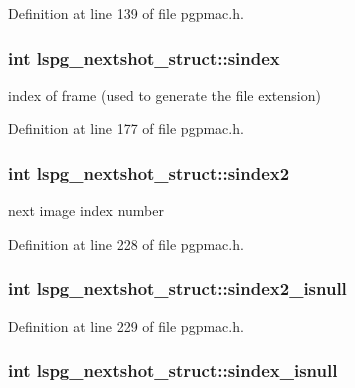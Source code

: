 Definition at line 139 of file pgpmac.h.\hypertarget{structlspg__nextshot__struct_a5d096f2c2bf9be29c44129b54eaf01da}{
\subsubsection[{sindex}]{\setlength{\rightskip}{0pt plus 5cm}int {\bf lspg\_\-nextshot\_\-struct::sindex}}}
\label{structlspg__nextshot__struct_a5d096f2c2bf9be29c44129b54eaf01da}


index of frame (used to generate the file extension) 

Definition at line 177 of file pgpmac.h.\hypertarget{structlspg__nextshot__struct_ae9d0cfdff6868e0ba9cd5acafbe133db}{
\subsubsection[{sindex2}]{\setlength{\rightskip}{0pt plus 5cm}int {\bf lspg\_\-nextshot\_\-struct::sindex2}}}
\label{structlspg__nextshot__struct_ae9d0cfdff6868e0ba9cd5acafbe133db}


next image index number 

Definition at line 228 of file pgpmac.h.\hypertarget{structlspg__nextshot__struct_a28e0b5c32a2741ef22edeb9d35b04e4d}{
\subsubsection[{sindex2\_\-isnull}]{\setlength{\rightskip}{0pt plus 5cm}int {\bf lspg\_\-nextshot\_\-struct::sindex2\_\-isnull}}}
\label{structlspg__nextshot__struct_a28e0b5c32a2741ef22edeb9d35b04e4d}


Definition at line 229 of file pgpmac.h.\hypertarget{structlspg__nextshot__struct_a7ca4fbc86974d1b75a681ba5ecaaf5af}{
\subsubsection[{sindex\_\-isnull}]{\setlength{\rightskip}{0pt plus 5cm}int {\bf lspg\_\-nextshot\_\-struct::sindex\_\-isnull}}}
\label{structlspg__nextshot__struct_a7ca4fbc86974d1b75a681ba5ecaaf5af}


